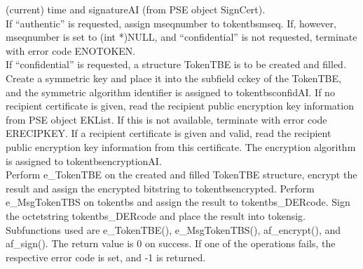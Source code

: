 (current) time and signatureAI (from PSE object SignCert).
\\
If ``authentic'' is requested, assign mseqnumber to
token\pf tbs\pf mseq.
If, however, mseqnumber is set to (int *)NULL,
and ``confidential'' is not requested,
terminate with error code ENOTOKEN.
\\
If ``confidential'' is requested,
a structure TokenTBE is to be created and filled.
Create a symmetric key and place it into the
subfield cckey of the TokenTBE,
and the symmetric algorithm identifier is assigned
to token\pf tbs\pf confidAI.
If no recipient certificate is given,
read the recipient public encryption key information from
PSE object EKList.
If this is not available, terminate with error code ERECIPKEY.
If a recipient certificate is given and valid,
read the recipient public encryption key information from
this certificate.
The encryption algorithm is assigned to token\pf tbs\pf encryptionAI.
\\
Perform e\_TokenTBE on the created and filled TokenTBE structure,
encrypt the result and assign the encrypted bitstring
to token\pf tbs\pf encrypted.
Perform e\_Msg\-To\-ken\-TBS on token\pf tbs and assign the result
to token\pf tbs\_DERcode.
Sign the octetstring token\pf tbs\_DERcode and place the result
into token\pf sig.
\\
Subfunctions used are e\_TokenTBE(), e\_MsgTokenTBS(), af\_encrypt(),
and af\_\-sign().
The return value is 0 on success.
If one of the operations fails,
the respective error code is set, and -1 is returned.


